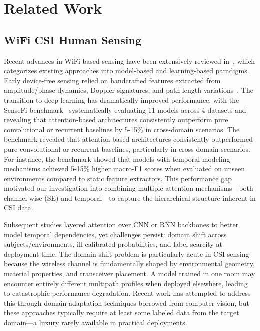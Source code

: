 \documentclass[journal]{IEEEtran}
\begin{document}
\section{Related Work}
\subsection{WiFi CSI Human Sensing}
Recent advances in WiFi-based sensing have been extensively reviewed in~\cite{liu2024wifi}, which categorizes existing approaches into model-based and learning-based paradigms. Early device-free sensing relied on handcrafted features extracted from amplitude/phase dynamics, Doppler signatures, and path length variations~\cite{wang2023privacy}. The transition to deep learning has dramatically improved performance, with the SenseFi benchmark~\cite{yang2023sensefi} systematically evaluating 11 models across 4 datasets and revealing that attention-based architectures consistently outperform pure convolutional or recurrent baselines by 5-15\% in cross-domain scenarios. The benchmark revealed that attention-based architectures consistently outperformed pure convolutional or recurrent baselines, particularly in cross-domain scenarios. For instance, the benchmark showed that models with temporal modeling mechanisms achieved 5-15\% higher macro-F1 scores when evaluated on unseen environments compared to static feature extractors. This performance gap motivated our investigation into combining multiple attention mechanisms—both channel-wise (SE) and temporal—to capture the hierarchical structure inherent in CSI data.

Subsequent studies layered attention over CNN or RNN backbones to better model temporal dependencies, yet challenges persist: domain shift across subjects/environments, ill-calibrated probabilities, and label scarcity at deployment time. The domain shift problem is particularly acute in CSI sensing because the wireless channel is fundamentally shaped by environmental geometry, material properties, and transceiver placement. A model trained in one room may encounter entirely different multipath profiles when deployed elsewhere, leading to catastrophic performance degradation. Recent work has attempted to address this through domain adaptation techniques borrowed from computer vision, but these approaches typically require at least some labeled data from the target domain—a luxury rarely available in practical deployments.
\end{document}
